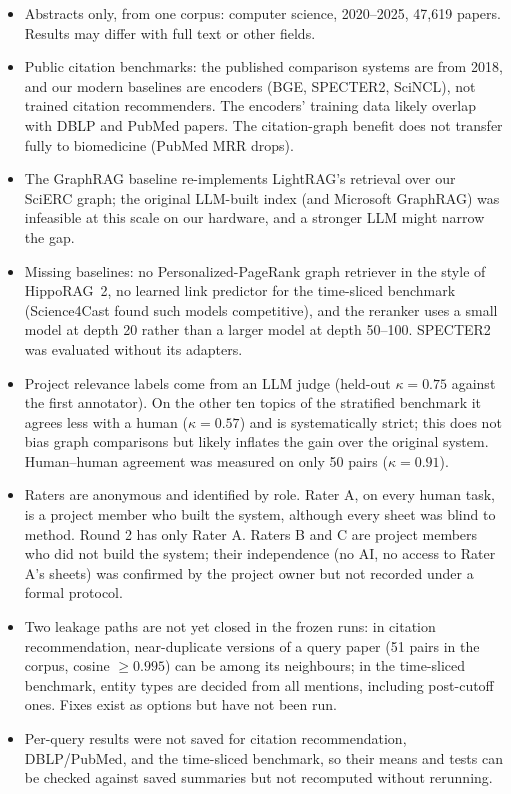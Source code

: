 \documentclass[conference]{IEEEtran}
\begin{document}
\begin{itemize}
\item Abstracts only, from one corpus: computer science, 2020--2025, 47,619 papers. Results may differ with full text or other fields.
\item Public citation benchmarks: the published comparison systems are from 2018, and our modern baselines are encoders (BGE, SPECTER2, SciNCL), not trained citation recommenders. The encoders' training data likely overlap with DBLP and PubMed papers. The citation-graph benefit does not transfer fully to biomedicine (PubMed MRR drops).
\item The GraphRAG baseline re-implements LightRAG's retrieval over our SciERC graph; the original LLM-built index (and Microsoft GraphRAG) was infeasible at this scale on our hardware, and a stronger LLM might narrow the gap.
\item Missing baselines: no Personalized-PageRank graph retriever in the style of HippoRAG~2, no learned link predictor for the time-sliced benchmark (Science4Cast found such models competitive), and the reranker uses a small model at depth 20 rather than a larger model at depth 50--100. SPECTER2 was evaluated without its adapters.
\item Project relevance labels come from an LLM judge (held-out $\kappa = 0.75$ against the first annotator). On the other ten topics of the stratified benchmark it agrees less with a human ($\kappa = 0.57$) and is systematically strict; this does not bias graph comparisons but likely inflates the gain over the original system. Human--human agreement was measured on only 50 pairs ($\kappa = 0.91$).
\item Raters are anonymous and identified by role. Rater A, on every human task, is a project member who built the system, although every sheet was blind to method. Round 2 has only Rater A. Raters B and C are project members who did not build the system; their independence (no AI, no access to Rater A's sheets) was confirmed by the project owner but not recorded under a formal protocol.
\item Two leakage paths are not yet closed in the frozen runs: in citation recommendation, near-duplicate versions of a query paper (51 pairs in the corpus, cosine $\geq 0.995$) can be among its neighbours; in the time-sliced benchmark, entity types are decided from all mentions, including post-cutoff ones. Fixes exist as options but have not been run.
\item Per-query results were not saved for citation recommendation, DBLP/PubMed, and the time-sliced benchmark, so their means and tests can be checked against saved summaries but not recomputed without rerunning.

\end{itemize}
\end{document}
